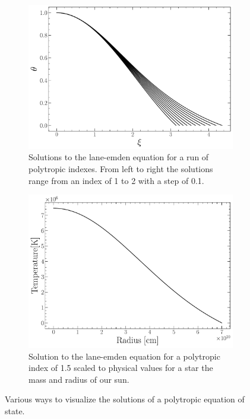\begin{figure}[htbp]
  \centering
  \begin{subfigure}[t]{0.45\textwidth}
    \centering
    \includegraphics[width=\textwidth]{figures/introduction/runofp.pdf}
    \caption{Solutions to the lane-emden equation for a run of polytropic
    indexes. From left to right the solutions range from an index of 1 to 2
    with a step of 0.1.}
    \label{fig:runofp}
  \end{subfigure}
  \begin{subfigure}[t]{0.45\textwidth}
      \centering
      \includegraphics[width=\textwidth]{figures/introduction/PolytropeTempProfile15.pdf}
      \caption{Solution to the lane-emden equation for a polytropic index of 1.5 scaled to
      physical values for a star the mass and radius of our sun.}
      \label{fig:polyScaled}
  \end{subfigure}
  \caption{Various ways to visualize the solutions of a polytropic equation of state.}
  \label{fig:polytropicSolutions}
\end{figure}



